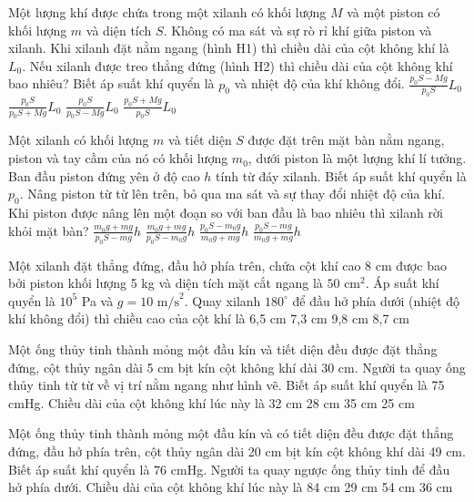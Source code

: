 \begin{ex}
Một lượng khí được chứa trong một xilanh có khối lượng $M$ và một piston có khối lượng $m$ và diện tích $S$. Không có ma sát và sự rò rỉ khí giữa piston và xilanh. Khi xilanh đặt nằm ngang (hình H1) thì chiều dài của cột không khí là $L_0$. Nếu xilanh được treo thẳng đứng (hình H2) thì chiều dài của cột không khí bao nhiêu? Biết áp suất khí quyển là $p_0$ và nhiệt độ của khí không đổi.
\choice
{$\frac{p_0S-Mg}{p_0S}L_0$}
{$\frac{p_0S}{p_0S+Mg}L_0$}
{$\frac{p_0S}{p_0S-Mg}L_0$}
{$\frac{p_0S+Mg}{p_0S}L_0$}
\end{ex}

\begin{ex}
Một xilanh có khối lượng $m$ và tiết diện $S$ được đặt trên mặt bàn nằm ngang, piston và tay cầm của nó có khối lượng $m_0$, dưới piston là một lượng khí lí tưởng. Ban đầu piston đứng yên ở độ cao $h$ tính từ đáy xilanh. Biết áp suất khí quyển là $p_0$. Nâng piston từ từ lên trên, bỏ qua ma sát và sự thay đổi nhiệt độ của khí. Khi piston được nâng lên một đoạn so với ban đầu là bao nhiêu thì xilanh rời khỏi mặt bàn?
\choice
{$\frac{m_0g+mg}{p_0S-mg}h$}
{$\frac{m_0g+mg}{p_0S-m_0g}h$}
{$\frac{p_0S-m_0g}{m_0g+mg}h$}
{$\frac{p_0S-mg}{m_0g+mg}h$}
\end{ex}

\begin{ex}
Một xilanh đặt thẳng đứng, đầu hở phía trên, chứa cột khí cao 8 cm được bao bởi piston khối lượng 5 kg và diện tích mặt cắt ngang là $50 \text{ cm}^2$. Áp suất khí quyển là $10^5$ Pa và $g=10 \text{ m/s}^2$. Quay xilanh $180^\circ$ để đầu hở phía dưới (nhiệt độ khí không đổi) thì chiều cao của cột khí là
\choice
{6,5 cm}
{7,3 cm}
{9,8 cm}
{8,7 cm}
\end{ex}

\begin{ex}
Một ống thủy tinh thành mỏng một đầu kín và tiết diện đều được đặt thẳng đứng, cột thủy ngân dài 5 cm bịt kín cột không khí dài 30 cm. Người ta quay ống thủy tinh từ từ về vị trí nằm ngang như hình vẽ. Biết áp suất khí quyển là 75 cmHg. Chiều dài của cột không khí lúc này là
\choice
{32 cm}
{28 cm}
{35 cm}
{25 cm}
\end{ex}

\begin{ex}
Một ống thủy tinh thành mỏng một đầu kín và có tiết diện đều được đặt thẳng đứng, đầu hở phía trên, cột thủy ngân dài 20 cm bịt kín cột không khí dài 49 cm. Biết áp suất khí quyển là 76 cmHg. Người ta quay ngược ống thủy tinh để đầu hở phía dưới. Chiều dài của cột không khí lúc này là
\choice
{84 cm}
{29 cm}
{54 cm}
{36 cm}
\end{ex}

